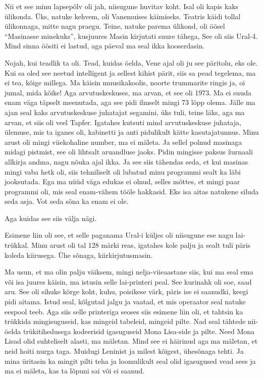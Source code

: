 Nii et see minu lapsepõlv oli jah, niisugune huvitav koht. Isal oli kapis kaks ülikonda. Üks, natuke kehvem, oli Vanemuises käimiseks. Teatris käidi tollal ülikonnaga, mitte nagu praegu. Teine, natuke parema ülikond, oli öösel \enquote{Masinasse minekuks}, kusjuures Masin kirjutati suure tähega, See oli siis Ural-4. Mind sinna öösiti ei lastud, aga  päeval ma seal ikka kooserdasin. 


Nojah, kui teadlik ta oli. Tead, kuidas öelda, Vene ajal oli ju see päritolu, eks ole. Kui sa oled see neetud intelligent ja sellest kihist pärit,  siis sa pead tegelema, ma ei tea, kõige millega. Ma käisin muusikakoolis, noorte trummarite ringis ja, oi jumal, mida kõike! Aga  arvutuskeskuses, ma arvan, et see oli 1973. Ma ei suuda enam väga täpselt meenutada, aga see pidi ilmselt mingi 73 lõpp olema. Jälle ma ajan seal kaks arvutuskeskuse juhatajat segamini, üks tuli, teine läks, aga ma arvan, et siis oli veel Tapfer. Igatahes kutsuti mind arvutuskeskuse juhataja, ülemuse,  mis ta iganes oli, kabinetti ja anti pidulikult kätte kasutajatunnus. Minu arust oli mingi viiekohaline number, ma ei mäleta. Ja sellel polnud masinaga midagi pistmist, see oli lihtsalt aruandluse jaoks. Pidin mingisse paksus žurnaali allkirja andma, nagu nõuka ajal ikka. Ja see siis tähendas seda, et kui masinas mingi vaba hetk oli, siis tehniliselt oli lubatud minu programmi sealt ka läbi jooksutada. Ega ma nüüd väga edukas ei olnud, selles mõttes, et mingi paar programmi oli, mis seal enam-vähem tööle hakkasid. Eks isa aitas natukene siluda seda asja. Vot seda sõna ka enam ei ole. 

Aga kuidas see siis välja nägi. 

Esimene liin oli see, et selle paganama Ural-i küljes oli niisugune ese nagu lai-trükkal. Minu arust oli tal 128 märki reas, igatahes kole palju ja sealt tuli päris koleda kiirusega. Ühe sõnaga, kiirkirjutusmasin. 

Ma usun, et ma olin palju väiksem, mingi nelja-viieaastane siis, kui ma seal ema või isa juures käisin, ma istusin selle lai-printeri peal. See kurinahk oli soe, saad aru. See oli sihuke kõrge koht, kuhu, poisikese värk, päris ise ei saanudki, keegi pidi aitama. Istud seal, kõlgutad jalgu ja vaatad, et mis operaator seal natuke eespool teeb. Aga siis selle printeriga seoses siis esimene liin oli, et tahtsin ka trükkida mingisuguseid, kas mingeid tabeleid, mingeid pilte. Nad seal tähtede nii-öelda  trükitihedusega kodeerisid  igasuguseid Mona Lisa-side ja pilte. Need Mona Lisad olid suhteliselt alasti, ma mäletan. Mind see ei häirinud aga ma mäletan, et neid hoiti nurga taga. Muidugi Leninist ja milest kõigest, ühesõnaga tehti. Ja mina üritasin ka mingit pilti teha ja loomulikult seal olid igasugused vead sees ja ma ei mäleta, kas ta lõpuni sai või ei saanud. 


